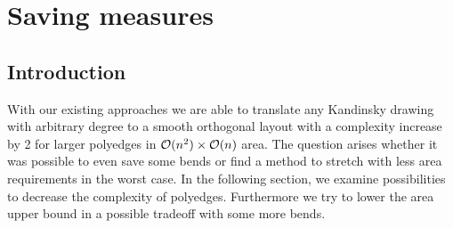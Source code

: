 \section{Saving measures}
\subsection{Introduction}
With our existing approaches we are able to translate any Kandinsky drawing with arbitrary degree to a smooth orthogonal layout with a complexity increase by 2 for larger polyedges in $\mathcal{O}(n^2)\times\mathcal{O}(n)$ area. The question arises whether it was possible to even save some bends or find a method to stretch with less area requirements in the worst case. In the following section, we examine possibilities to decrease the complexity of polyedges. Furthermore we try to lower the area upper bound in a possible tradeoff with some more bends.

